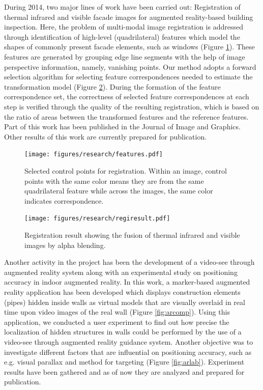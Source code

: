 \documentclass[10pt, a4paper]{article}
\begin{document}
{\begin{enumerate}
{During 2014, two major lines of work have been carried out: Registration of thermal infrared and visible facade images for augmented reality-based building inspection. Here, the problem of multi-modal image registration is addressed through identification of high-level (quadrilateral) features which model the shapes of commonly present facade elements, such as windows (Figure \ref{fig:regone}). These features are generated by grouping edge line segments with the help of image perspective information, namely, vanishing points. Our method adopts a forward selection algorithm for selecting feature correspondences needed to estimate the transformation model (Figure \ref{fig:regtwo}). During the formation of the feature correspondence set, the correctness of selected feature correspondences at each step is verified through the quality of the resulting registration, which is based on the ratio of areas between the transformed features and the reference features. Part of this work has been published in the Journal of Image and Graphics. Other results of this work are currently prepared for publication.}

\begin{figure}[!htbp]
\centering
\texttt{[image: figures/research/features.pdf]}
\caption{\label{fig:regone} Selected control points for registration. Within an image, control points with the same color means they are from the same quadrilateral feature while across the images, the same color indicates correspondence.} 
\end{figure}

\begin{figure}[!htbp]
\centering
\texttt{[image: figures/research/regiresult.pdf]}
\caption{\label{fig:regtwo} Registration result showing the fusion of thermal infrared and visible images by alpha blending.} 
\end{figure}

Another activity in the project has been the development of a video-see through augmented reality system along with an experimental study on positioning accuracy in indoor augmented reality. In this work, a marker-based augmented reality application has been developed which displays construction elements (pipes) hidden inside walls as virtual models that are visually overlaid in real time upon video images of the real wall (Figure \ref{fig:arcomp}). Using this application, we conducted a user experiment to find out how precise the localization of hidden structures in walls could be performed by the use of a video-see through augmented reality guidance system. Another objective was to investigate different factors that are influential on positioning accuracy, such as e.g. visual parallax and method for targeting (Figure \ref{fig:arlab}). Experiment results have been gathered and as of now they are analyzed and prepared for publication. 


\end{enumerate}}
\end{document}
